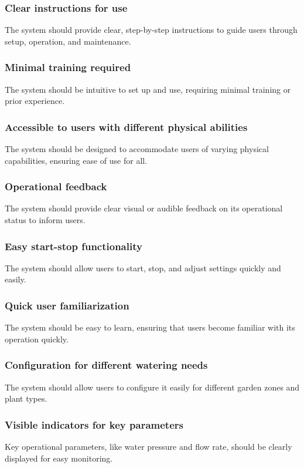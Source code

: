 \documentclass[12pt]{report}
\begin{document}
\subsubsection{Clear instructions for use}
The system should provide clear, step-by-step instructions to guide users through setup, operation, and maintenance.

\subsubsection{Minimal training required}
The system should be intuitive to set up and use, requiring minimal training or prior experience.

\subsubsection{Accessible to users with different physical abilities}
The system should be designed to accommodate users of varying physical capabilities, ensuring ease of use for all.

\subsubsection{Operational feedback}
The system should provide clear visual or audible feedback on its operational status to inform users.

\subsubsection{Easy start-stop functionality}
The system should allow users to start, stop, and adjust settings quickly and easily.

\subsubsection{Quick user familiarization}
The system should be easy to learn, ensuring that users become familiar with its operation quickly.

\subsubsection{Configuration for different watering needs}
The system should allow users to configure it easily for different garden zones and plant types.

\subsubsection{Visible indicators for key parameters}
Key operational parameters, like water pressure and flow rate, should be clearly displayed for easy monitoring.
\end{document}
